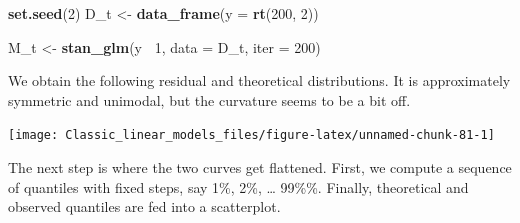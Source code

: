 \documentclass[]{svmono}
\newenvironment{Shaded}{\begin{snugshade}}{\end{snugshade}}
\newcommand{\KeywordTok}[1]{\textcolor[rgb]{0.13,0.29,0.53}{\textbf{#1}}}
\newcommand{\DataTypeTok}[1]{\textcolor[rgb]{0.13,0.29,0.53}{#1}}
\newcommand{\DecValTok}[1]{\textcolor[rgb]{0.00,0.00,0.81}{#1}}
\newcommand{\StringTok}[1]{\textcolor[rgb]{0.31,0.60,0.02}{#1}}
\newcommand{\OperatorTok}[1]{\textcolor[rgb]{0.81,0.36,0.00}{\textbf{#1}}}
\newcommand{\NormalTok}[1]{#1}
\begin{document}
\begin{Shaded}
\begin{Highlighting}[]
\KeywordTok{set.seed}\NormalTok{(}\DecValTok{2}\NormalTok{)}
\NormalTok{D_t <-}\StringTok{ }\KeywordTok{data_frame}\NormalTok{(}\DataTypeTok{y =} \KeywordTok{rt}\NormalTok{(}\DecValTok{200}\NormalTok{, }\DecValTok{2}\NormalTok{))}
\end{Highlighting}
\end{Shaded}

\begin{Shaded}
\begin{Highlighting}[]
\NormalTok{M_t <-}\StringTok{ }\KeywordTok{stan_glm}\NormalTok{(y }\OperatorTok{~}\DecValTok{1}\NormalTok{, }\DataTypeTok{data =}\NormalTok{ D_t, }\DataTypeTok{iter =} \DecValTok{200}\NormalTok{)}
\end{Highlighting}
\end{Shaded}

We obtain the following residual and theoretical distributions. It is
approximately symmetric and unimodal, but the curvature seems to be a
bit off.

\begin{Shaded}
\end{Shaded}

\texttt{[image: Classic\_linear\_models\_files/figure-latex/unnamed-chunk-81-1]}

The next step is where the two curves get flattened. First, we compute a
sequence of quantiles with fixed steps, say 1\%, 2\%, \ldots{} 99\%\%.
Finally, theoretical and observed quantiles are fed into a scatterplot.
\end{document}
